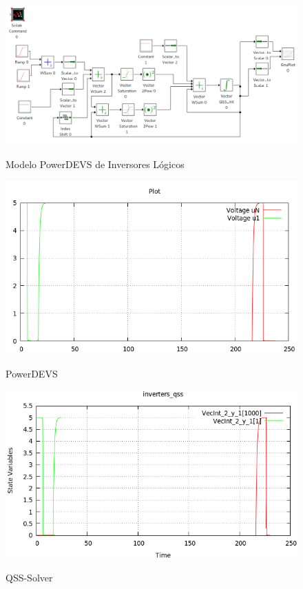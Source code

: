 \begin{figure}[H]
\includegraphics[width=0.75\linewidth]{inverters}
\label{model:inverters}
\caption{Modelo PowerDEVS de Inversores Lógicos}
\end{figure}

\begin{figure}[H]
\begin{minipage}{0.5\textwidth}
 \includegraphics[width=\linewidth]{inversers-pd}
\label{graph:inverters-pd}
\caption{PowerDEVS}
\end{minipage}\hfill
\begin{minipage}{0.5\textwidth}
 \includegraphics[width=\linewidth]{inversers-qss}
\label{graph:inverters-qss}
\caption{QSS-Solver}
\end{minipage}
\end{figure}


